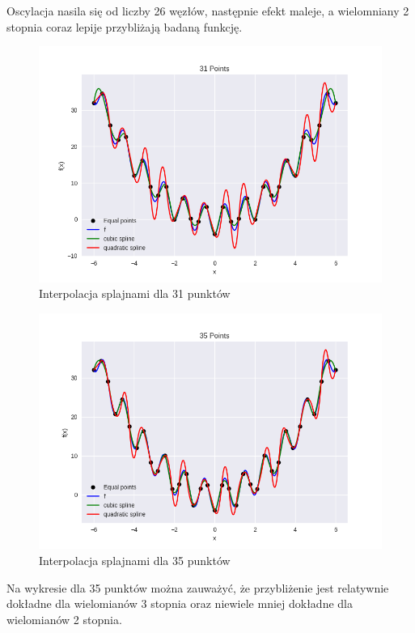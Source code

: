 \documentclass{article}
\begin{document}
Oscylacja nasila się od liczby 26 węzłów, następnie efekt maleje, a wielomniany 2 stopnia coraz lepije przybliżają badaną funkcję.

\begin{figure}[H]
    \centering
    \includegraphics[width=\textwidth]{img/spline_31.png}
    \caption{Interpolacja splajnami dla 31 punktów}
\end{figure}

\begin{figure}[H]
    \centering
    \includegraphics[width=\textwidth]{img/spline_35.png}
    \caption{Interpolacja splajnami dla 35 punktów}
\end{figure}

Na wykresie dla 35 punktów można zauważyć, że przybliżenie jest relatywnie dokładne dla wielomianów 3 stopnia oraz niewiele mniej dokładne
dla wielomianów 2 stopnia.
\end{document}
